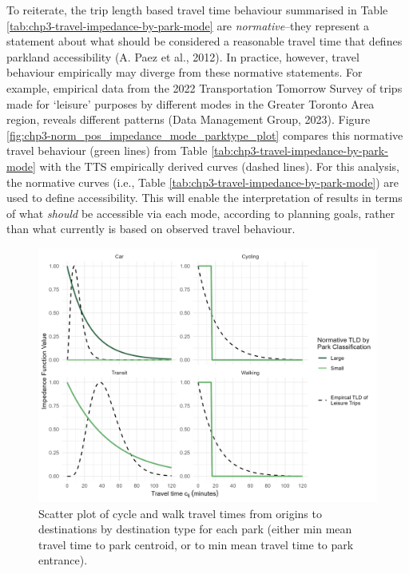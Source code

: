 \documentclass[
11pt, %
oneside, %
english, %
singlespacing, %
]{macthesis} %
\begin{document}
To reiterate, the trip length based travel time behaviour summarised in Table \ref{tab:chp3-travel-impedance-by-park-mode} are \emph{normative}--they represent a statement about what should be considered a reasonable travel time that defines parkland accessibility (A. Paez et al., 2012). In practice, however, travel behaviour empirically may diverge from these normative statements. For example, empirical data from the 2022 Transportation Tomorrow Survey of trips made for `leisure' purposes by different modes in the Greater Toronto Area region, reveals different patterns (Data Management Group, 2023). Figure \ref{fig:chp3-norm_pos_impedance_mode_parktype_plot} compares this normative travel behaviour (green lines) from Table \ref{tab:chp3-travel-impedance-by-park-mode} with the TTS empirically derived curves (dashed lines). For this analysis, the normative curves (i.e., Table \ref{tab:chp3-travel-impedance-by-park-mode}) are used to define accessibility. This will enable the interpretation of results in terms of what \emph{should} be accessible via each mode, according to planning goals, rather than what currently is based on observed travel behaviour.

\begin{figure}

{\centering \includegraphics[width=6in]{./data/figures/chp3-norm_pos_impedance_mode_parktype_plot} 

}

\caption{\label{fig:chp3-norm_pos_impedance_mode_parktype_plot}  Scatter plot of cycle and walk travel times from origins to destinations by destination type for each park (either min mean travel time to park centroid, or to min mean travel time to park entrance). }\label{fig:unnamed-chunk-50}
\end{figure}
\end{document}
